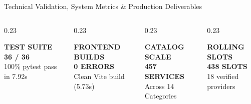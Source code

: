 \documentclass[aspectratio=169,11pt]{beamer}
\begin{document}
\begin{frame}{Technical Validation, System Metrics \& Production Deliverables}
\begin{columns}[T]
  \begin{column}{0.23\textwidth}
    \begin{tcolorbox}[colback=white,colframe=SmartGreen,arc=2mm,halign=center]
      {\tiny \textbf{TEST SUITE}}\\[0.1cm]
      {\large \textbf{\color{SmartGreen}36 / 36}} \\
      {\tiny 100\% pytest pass in 7.92s}
    \end{tcolorbox}
  \end{column}
  \begin{column}{0.23\textwidth}
    \begin{tcolorbox}[colback=white,colframe=SmartBlue,arc=2mm,halign=center]
      {\tiny \textbf{FRONTEND BUILDS}}\\[0.1cm]
      {\large \textbf{\color{SmartBlue}0 ERRORS}} \\
      {\tiny Clean Vite build (5.73s)}
    \end{tcolorbox}
  \end{column}
  \begin{column}{0.23\textwidth}
    \begin{tcolorbox}[colback=white,colframe=SmartDark,arc=2mm,halign=center]
      {\tiny \textbf{CATALOG SCALE}}\\[0.1cm]
      {\large \textbf{\color{SmartDark}457 SERVICES}} \\
      {\tiny Across 14 Categories}
    \end{tcolorbox}
  \end{column}
  \begin{column}{0.23\textwidth}
    \begin{tcolorbox}[colback=white,colframe=SmartGold,arc=2mm,halign=center]
      {\tiny \textbf{ROLLING SLOTS}}\\[0.1cm]
      {\large \textbf{\color{SmartGold}438 SLOTS}} \\
      {\tiny 18 verified providers}
    \end{tcolorbox}
  \end{column}
\end{columns}
\vspace{0.3cm}
\begin{tcolorbox}[colback=white,colframe=SmartGreen,arc=3mm,title=\textbf{\scriptsize LIVE PRODUCTION DELIVERABLES SUMMARY}]

\end{tcolorbox}
\end{frame}
\end{document}
